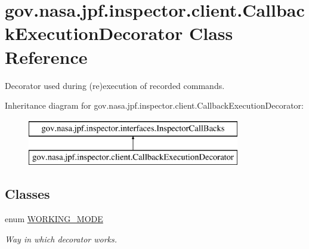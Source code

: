 \hypertarget{classgov_1_1nasa_1_1jpf_1_1inspector_1_1client_1_1_callback_execution_decorator}{}\section{gov.\+nasa.\+jpf.\+inspector.\+client.\+Callback\+Execution\+Decorator Class Reference}
\label{classgov_1_1nasa_1_1jpf_1_1inspector_1_1client_1_1_callback_execution_decorator}


Decorator used during (re)execution of recorded commands.  


Inheritance diagram for gov.\+nasa.\+jpf.\+inspector.\+client.\+Callback\+Execution\+Decorator\+:\begin{figure}[H]
\begin{center}
\leavevmode
\includegraphics[height=2.000000cm]{classgov_1_1nasa_1_1jpf_1_1inspector_1_1client_1_1_callback_execution_decorator}
\end{center}
\end{figure}
\subsection*{Classes}
\begin{DoxyCompactItemize}
\item 
enum \hyperlink{enumgov_1_1nasa_1_1jpf_1_1inspector_1_1client_1_1_callback_execution_decorator_1_1_w_o_r_k_i_n_g___m_o_d_e}{W\+O\+R\+K\+I\+N\+G\+\_\+\+M\+O\+DE}
\begin{DoxyCompactList}\small\item\em Way in which decorator works. \end{DoxyCompactList}\end{DoxyCompactItemize}
